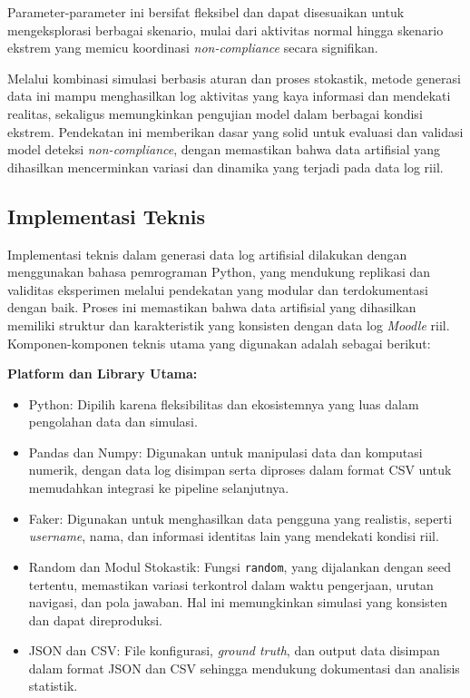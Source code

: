 Parameter-parameter ini bersifat fleksibel dan dapat disesuaikan untuk mengeksplorasi berbagai skenario, mulai dari aktivitas normal hingga skenario ekstrem yang memicu koordinasi \textit{non-compliance} secara signifikan.

Melalui kombinasi simulasi berbasis aturan dan proses stokastik, metode generasi data ini mampu menghasilkan log aktivitas yang kaya informasi dan mendekati realitas, sekaligus memungkinkan pengujian model dalam berbagai kondisi ekstrem. Pendekatan ini memberikan dasar yang solid untuk evaluasi dan validasi model deteksi \textit{non-compliance}, dengan memastikan bahwa data artifisial yang dihasilkan mencerminkan variasi dan dinamika yang terjadi pada data log riil.

\subsection{Implementasi Teknis}
\label{sec:implementasiTeknis}
Implementasi teknis dalam generasi data log artifisial dilakukan dengan menggunakan bahasa pemrograman Python, yang mendukung replikasi dan validitas eksperimen melalui pendekatan yang modular dan terdokumentasi dengan baik. Proses ini memastikan bahwa data artifisial yang dihasilkan memiliki struktur dan karakteristik yang konsisten dengan data log \textit{Moodle} riil. Komponen-komponen teknis utama yang digunakan adalah sebagai berikut:

\textbf{Platform dan Library Utama:} \\
\begin{itemize}
    \item Python: Dipilih karena fleksibilitas dan ekosistemnya yang luas dalam pengolahan data dan simulasi.
    \item Pandas dan Numpy: Digunakan untuk manipulasi data dan komputasi numerik, dengan data log disimpan serta diproses dalam format CSV untuk memudahkan integrasi ke pipeline selanjutnya.
    \item Faker: Digunakan untuk menghasilkan data pengguna yang realistis, seperti \textit{username}, nama, dan informasi identitas lain yang mendekati kondisi riil.
    \item Random dan Modul Stokastik: Fungsi \texttt{random}, yang dijalankan dengan seed tertentu, memastikan variasi terkontrol dalam waktu pengerjaan, urutan navigasi, dan pola jawaban. Hal ini memungkinkan simulasi yang konsisten dan dapat direproduksi.
    \item JSON dan CSV: File konfigurasi, \textit{ground truth}, dan output data disimpan dalam format JSON dan CSV sehingga mendukung dokumentasi dan analisis statistik.
\end{itemize}

